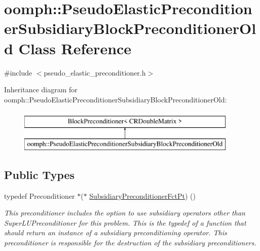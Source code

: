 \hypertarget{classoomph_1_1PseudoElasticPreconditionerSubsidiaryBlockPreconditionerOld}{}\section{oomph\+:\+:Pseudo\+Elastic\+Preconditioner\+Subsidiary\+Block\+Preconditioner\+Old Class Reference}
\label{classoomph_1_1PseudoElasticPreconditionerSubsidiaryBlockPreconditionerOld}


{\ttfamily \#include $<$pseudo\+\_\+elastic\+\_\+preconditioner.\+h$>$}

Inheritance diagram for oomph\+:\+:Pseudo\+Elastic\+Preconditioner\+Subsidiary\+Block\+Preconditioner\+Old\+:\begin{figure}[H]
\begin{center}
\leavevmode
\includegraphics[height=2.000000cm]{classoomph_1_1PseudoElasticPreconditionerSubsidiaryBlockPreconditionerOld}
\end{center}
\end{figure}
\subsection*{Public Types}
\begin{DoxyCompactItemize}
\item 
typedef Preconditioner $\ast$($\ast$ \hyperlink{classoomph_1_1PseudoElasticPreconditionerSubsidiaryBlockPreconditionerOld_a85f57923e70244d5fde0538946eb8c3d}{Subsidiary\+Preconditioner\+Fct\+Pt}) ()
\begin{DoxyCompactList}\small\item\em This preconditioner includes the option to use subsidiary operators other than Super\+L\+U\+Preconditioner for this problem. This is the typedef of a function that should return an instance of a subsidiary preconditioning operator. This preconditioner is responsible for the destruction of the subsidiary preconditioners. \end{DoxyCompactList}\end{DoxyCompactItemize}
